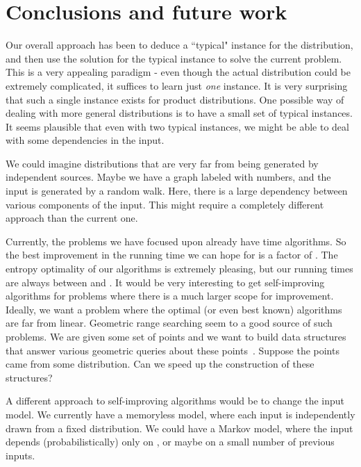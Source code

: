 \documentclass{siamltex}
\begin{document}
\section{Conclusions and future work}

Our overall approach has been to deduce a ``typical" instance for the
distribution, and then use the solution for the typical instance to solve the
current problem.  This is a very appealing paradigm - even though the actual
distribution  could be extremely complicated, it suffices to learn just
\emph{one} instance.  It is very surprising that such a single instance exists
for product distributions.  One possible way of dealing with more general
distributions is to have a small set of typical instances. It seems plausible
that even with two typical instances, we might be able to deal with some
dependencies in the input.

We could imagine distributions that are very far from being generated by
independent sources. Maybe we have a graph labeled with numbers, and the input
is generated by a random walk. Here, there is a large dependency between
various components of the input. This might require a completely different
approach than the current one.

Currently, the problems we have focused upon already have  time
algorithms.  So the best improvement in the running time we can hope for is a
factor of . The entropy optimality of our algorithms is extremely
pleasing, but our running times are always between  and .  It
would be very interesting to get self-improving algorithms for problems where
there is a much larger scope for improvement. Ideally, we want a problem where
the optimal (or even best known) algorithms are far from linear. Geometric
range searching seem to a good source of such problems. We are given some set
of points and we want to build data structures that answer various geometric
queries about these points~\cite{AE98}. Suppose the points came from some
distribution.  Can we speed up the construction of these structures? 

A different approach to self-improving algorithms would be to change the input
model. We currently have a memoryless model, where each input is independently
drawn from a fixed distribution.  We could have a Markov model, where the input
 depends (probabilistically) only on , or maybe on a small number
of previous inputs. 







\end{document}
